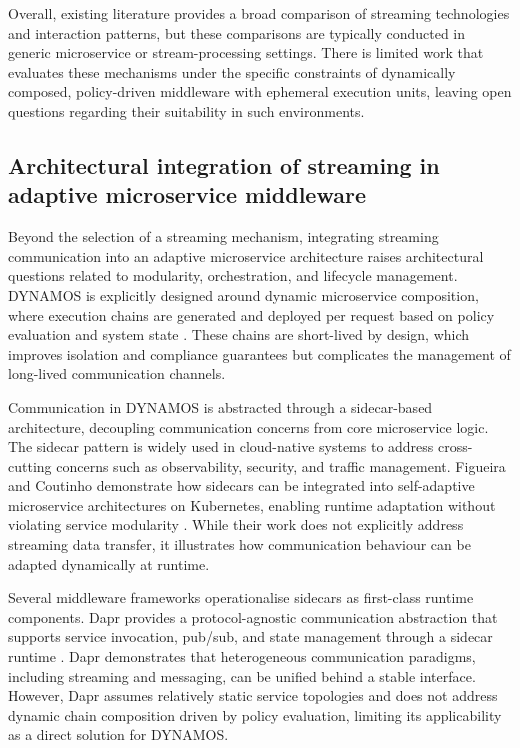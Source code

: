 \documentclass[a4paper,10pt,british]{scrartcl}
\begin{document}
Overall, existing literature provides a broad comparison of streaming technologies and interaction patterns, but these comparisons are typically conducted in generic microservice or stream-processing settings. There is limited work that evaluates these mechanisms under the specific constraints of dynamically composed, policy-driven middleware with ephemeral execution units, leaving open questions regarding their suitability in such environments.

\subsection{Architectural integration of streaming in adaptive microservice middleware}

Beyond the selection of a streaming mechanism, integrating streaming communication into an adaptive microservice architecture raises architectural questions related to modularity, orchestration, and lifecycle management. DYNAMOS is explicitly designed around dynamic microservice composition, where execution chains are generated and deployed per request based on policy evaluation and system state \cite{stutterheim2023thesis,stutterheim2023icsa}. These chains are short-lived by design, which improves isolation and compliance guarantees but complicates the management of long-lived communication channels.

Communication in DYNAMOS is abstracted through a sidecar-based architecture, decoupling communication concerns from core microservice logic. The sidecar pattern is widely used in cloud-native systems to address cross-cutting concerns such as observability, security, and traffic management. Figueira and Coutinho demonstrate how sidecars can be integrated into self-adaptive microservice architectures on Kubernetes, enabling runtime adaptation without violating service modularity \cite{figueira2024selfadaptive}. While their work does not explicitly address streaming data transfer, it illustrates how communication behaviour can be adapted dynamically at runtime.

Several middleware frameworks operationalise sidecars as first-class runtime components. Dapr provides a protocol-agnostic communication abstraction that supports service invocation, pub/sub, and state management through a sidecar runtime \cite{figueira2024selfadaptive}. Dapr demonstrates that heterogeneous communication paradigms, including streaming and messaging, can be unified behind a stable interface. However, Dapr assumes relatively static service topologies and does not address dynamic chain composition driven by policy evaluation, limiting its applicability as a direct solution for DYNAMOS.
\end{document}
